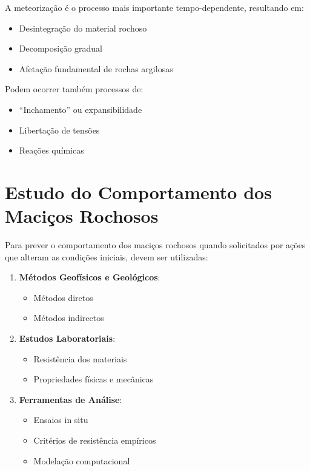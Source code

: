 \documentclass[12pt,a4paper,twoside]{book}
\begin{document}
A meteorização é o processo mais importante tempo-dependente, resultando em:
\begin{itemize}
    \item Desintegração do material rochoso
    \item Decomposição gradual
    \item Afetação fundamental de rochas argilosas
\end{itemize}

Podem ocorrer também processos de:
\begin{itemize}
    \item ``Inchamento'' ou expansibilidade
    \item Libertação de tensões
    \item Reações químicas
\end{itemize}

\section{Estudo do Comportamento dos Maciços Rochosos}

Para prever o comportamento dos maciços rochosos quando solicitados por ações que alteram as 
condições iniciais, devem ser utilizadas:

\begin{enumerate}
    \item \textbf{Métodos Geofísicos e Geológicos}:
    \begin{itemize}
        \item Métodos diretos
        \item Métodos indirectos
    \end{itemize}
    
    \item \textbf{Estudos Laboratoriais}:
    \begin{itemize}
        \item Resistência dos materiais
        \item Propriedades físicas e mecânicas
    \end{itemize}
    
    \item \textbf{Ferramentas de Análise}:
    \begin{itemize}
        \item Ensaios in situ
        \item Critérios de resistência empíricos
        \item Modelação computacional
    \end{itemize}
\end{enumerate}
\end{document}
